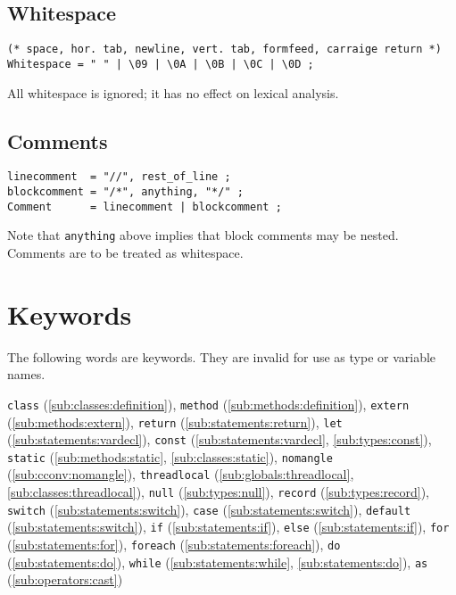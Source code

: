 \documentclass{article}
\begin{document}
\subsection{Whitespace}
\label{sub:lexicals:whitespace}
\begin{verbatim}
(* space, hor. tab, newline, vert. tab, formfeed, carraige return *)
Whitespace = " " | \09 | \0A | \0B | \0C | \0D ;
\end{verbatim}
All whitespace is ignored; it has no effect on lexical analysis.

\subsection{Comments}
\label{sub:lexicals:comments}
\begin{verbatim}
linecomment  = "//", rest_of_line ;
blockcomment = "/*", anything, "*/" ;
Comment      = linecomment | blockcomment ;
\end{verbatim}
Note that \texttt{anything} above implies that block comments may be nested.
Comments are to be treated as whitespace.

\section{Keywords}
\label{sec:keywords}
The following words are keywords. They are invalid for use as type or variable
names.

\texttt{class} (\ref{sub:classes:definition}),
\texttt{method} (\ref{sub:methods:definition}),
\texttt{extern} (\ref{sub:methods:extern}),
\texttt{return} (\ref{sub:statements:return}),
\texttt{let} (\ref{sub:statements:vardecl}),
\texttt{const} (\ref{sub:statements:vardecl}, \ref{sub:types:const}),
\texttt{static} (\ref{sub:methods:static}, \ref{sub:classes:static}),
\texttt{nomangle} (\ref{sub:cconv:nomangle}),
\texttt{threadlocal} (\ref{sub:globals:threadlocal},
                      \ref{sub:classes:threadlocal}),
\texttt{null} (\ref{sub:types:null}),
\texttt{record} (\ref{sub:types:record}),
\texttt{switch} (\ref{sub:statements:switch}),
\texttt{case} (\ref{sub:statements:switch}),
\texttt{default} (\ref{sub:statements:switch}),
\texttt{if} (\ref{sub:statements:if}),
\texttt{else} (\ref{sub:statements:if}),
\texttt{for} (\ref{sub:statements:for}),
\texttt{foreach} (\ref{sub:statements:foreach}),
\texttt{do} (\ref{sub:statements:do}),
\texttt{while} (\ref{sub:statements:while}, \ref{sub:statements:do}),
\texttt{as} (\ref{sub:operators:cast})
\end{document}
